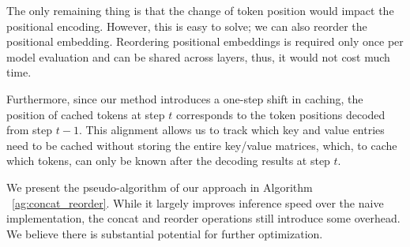 \documentclass{article}
\begin{document}
The only remaining thing is that the change of token position would impact the positional encoding. 
However, this is easy to solve; we can also reorder the positional embedding.
Reordering positional embeddings is required only once per model evaluation and can be shared across layers, thus, it would not cost much time.

Furthermore, since our method introduces a one-step shift in caching, the position of cached tokens at step $t$ corresponds to the token positions decoded from step $t-1$. This alignment allows us to track which key and value entries need to be cached without storing the entire key/value matrices, which, to cache which tokens, can only be known after the decoding results at step $t$. 

We present the pseudo-algorithm of our approach in Algorithm ~\ref{ag:concat_reorder}. While it largely improves inference speed over the naive implementation, the concat and reorder operations still introduce some overhead. We believe there is substantial potential for further optimization.
\end{document}
